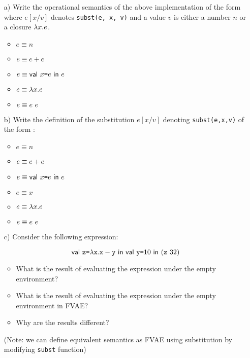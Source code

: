 \begin{enumerate}
\begin{itemize}
  \item[a)]
Write the operational semantics of the above implementation
of the form 
where $e[x/v]$ denotes \verb!subst(e, x, v)! and a value $v$ is either a number $n$ or
a closure $\lambda x.e$.

\begin{itemize}
  \item $e \equiv n$
  \item $e \equiv e+e$
  \item $e \equiv \textsf{val}\ x\texttt{=} e\ \textsf{in}\ e$
  \item $e \equiv \lambda x.e$
  \item $e \equiv e\ e$
\end{itemize}

  \item[b)] Write the definition of the substitution $e[x/v]$ denoting \verb!subst(e,x,v)!
of the form :
\begin{itemize}
  \item $e \equiv n$
  \item $e \equiv e+e$
  \item $e \equiv \textsf{val}\ x\texttt{=} e\ \textsf{in}\ e$
  \item $e \equiv x$
  \item $e \equiv \lambda x.e$
  \item $e \equiv e\ e$
\end{itemize}

  \item[c)] Consider the following expression:

\[
\ebind{\code{z}}{\efun{\cx}{\esub{\cx}{\cy}}}{
    \ebind{\cy}{10}{
        (\eapp{\code{z}}{32})
    }
}
\]

\begin{itemize}
\item What is the result of evaluating the expression under the empty environment?
\item What is the result of evaluating the expression under the empty environment in FVAE?
\item Why are the results different?
\end{itemize}
    (Note: we can define equivalent semantics as FVAE using substitution
    by modifying \verb!subst! function)


\end{itemize}

\end{enumerate}
